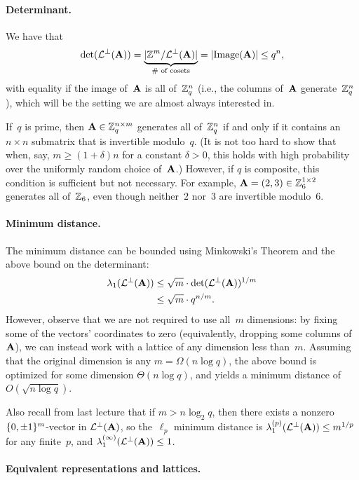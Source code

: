 \documentclass[11pt]{article}
\begin{document}
\paragraph{Determinant.}

We have that
\[ \det(\latperp(\matA)) = \underbrace{\abs{\Z^m /
      \latperp(\matA)}}_{\mathclap{\text{\# of cosets}}} =
  \abs{\text{Image}(\matA)} \leq q^{n} , \] with equality if the image
of~$\mathbf{A}$ is all of~$\mathbb{Z}_q^{n}$ (i.e., the columns of~$\mathbf{A}$
generate~$\mathbb{Z}_q^{n}$), which will be the setting we are almost always
interested in.

If~$q$ is prime, then $\mathbf{A} \in \mathbb{Z}_q^{n \times m}$ generates all
of~$\mathbb{Z}_q^n$ if and only if it contains an $n \times n$ submatrix that
is invertible modulo~$q$. (It is not too hard to show that when, say,
$m \geq (1+\delta)n$ for a constant $\delta > 0$, this holds with high
probability over the uniformly random choice of~$\mathbf{A}$.) However, if
$q$ is composite, this condition is sufficient but not necessary. For
example, $\mathbf{A}=(2, 3) \in \mathbb{Z}_6^{1 \times 2}$ generates all of~$\mathbb{Z}_6$,
even though neither~$2$ nor~$3$ are invertible modulo~$6$.

\paragraph{Minimum distance.}

The minimum distance can be bounded using Minkowski's Theorem and the
above bound on the determinant:
\begin{align*}
  \lambda_1(\mathcal{L}^{\perp}(\mathbf{A}))
  &\leq \sqrt{m} \cdot \det(\mathcal{L}^{\perp}(\mathbf{A}))^{1/m} \\
  &\leq \sqrt{m} \cdot q^{n/m} .
\end{align*}
However, observe that we are not required to use all~$m$ dimensions:
by fixing some of the vectors' coordinates to zero (equivalently,
dropping some columns of~$\mathbf{A}$), we can instead work with a lattice
of any dimension less than~$m$. Assuming that the original dimension
is any $m = \Omega(n \log q)$, the above bound is optimized for some
dimension $\Theta(n \log q)$, and yields a minimum distance of
$O(\sqrt{n \log q})$.

Also recall from last lecture that if $m > n \log_{2} q$, then there
exists a nonzero $\{0,\pm 1\}^{m}$-vector in $\mathcal{L}^{\perp}(\mathbf{A})$, so
the~$\ell_{p}$ minimum distance is
$\lambda_{1}^{(p)}(\mathcal{L}^{\perp}(\mathbf{A})) \leq m^{1/p}$ for any finite~$p$,
and $\lambda_{1}^{(\infty)}(\mathcal{L}^{\perp}(\mathbf{A})) \leq 1$.

\paragraph{Equivalent representations and lattices.}
\end{document}
